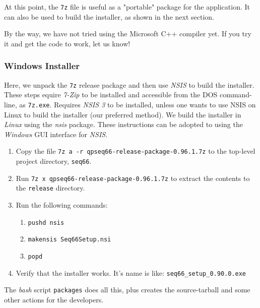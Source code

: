    At this point, the \texttt{7z} file is useful as a "portable" package
   for the application.  It can also be used to build the installer, as
   shown in the next section.

   By the way, we have not tried using the Microsoft C++ compiler yet.
   If you try it and get the code to work, let us know!

\subsubsection{Windows Installer}
\label{subsec:build_installer_windows}

   Here, we unpack the \texttt{7z} release package and then use
   \textsl{NSIS} to build the installer.
   These steps equire \textsl{7-Zip}
   to be installed and accessible from the DOS
   command-line, as \texttt{7z.exe}.
   Requires \textsl{NSIS 3} to be installed, unless one wants to use
   NSIS on Linux to build the installer (our preferred method).
   We build the installer in \textsl{Linux} using the
   \textsl{nsis} package.  These instructions can be adopted to using the
   \textsl{Windows} GUI interface for \textsl{NSIS}.

   \begin{enumerate}
      \item Copy the file
         \texttt{7z a -r qpseq66-release-package-0.96.1.7z} to
         the top-level project directory, \texttt{seq66}.
      \item Run
         \texttt{7z x qpseq66-release-package-0.96.1.7z} to extract
         the contents to the \texttt{release} directory.
      \item Run the following commands:
         \begin{enumerate}
            \item \texttt{pushd nsis}
            \item \texttt{makensis Seq66Setup.nsi}
            \item \texttt{popd}
         \end{enumerate}
      \item Verify that the installer works.  It's name is like:
         \texttt{seq66\_setup\_0.90.0.exe}
   \end{enumerate}

   The \textsl{bash} script \texttt{packages} does all this, plus
   creates the source-tarball and some other actions for the developers.

